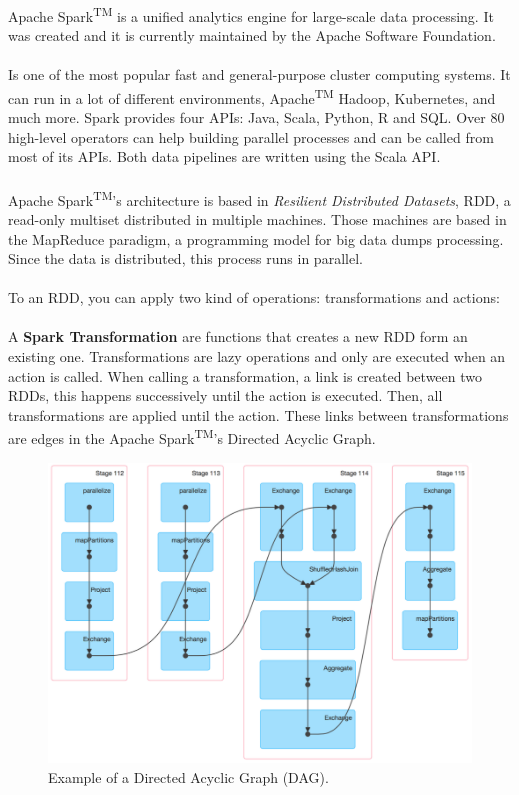 Apache Spark\textsuperscript{TM} is a unified analytics engine for large-scale data processing. It was created and it is currently maintained by the Apache Software Foundation\cite{apache_software_foundation}.
\\\\
Is one of the most popular fast and general-purpose cluster computing systems. It can run in a lot of different environments, Apache\textsuperscript{TM} Hadoop\textregistered\cite{hadoop}, Kubernetes\cite{k8s},  and much more. Spark provides four APIs: Java, Scala, Python, R and SQL. Over 80 high-level operators can help building parallel processes and can be called from most of its APIs. Both data pipelines are written using the Scala API.
\\\\
Apache Spark\textsuperscript{TM}'s architecture is based in \textit{Resilient Distributed Datasets}, RDD, a read-only multiset distributed in multiple machines. Those machines are based in the MapReduce paradigm, a programming model for big data dumps processing. Since the data is distributed, this process runs in parallel.
\\\\
To an RDD, you can apply two kind of operations: transformations and actions:
\\\\
A \textbf{Spark Transformation} are functions that creates a new RDD form an existing one. Transformations are lazy operations and only are executed when an action is called. When calling a transformation, a link is created between two RDDs, this happens successively until the action is executed. Then, all transformations are applied until the action. These links between transformations are edges in the Apache Spark\textsuperscript{TM}'s Directed Acyclic Graph.

\begin{figure}[H]
\centering
\includegraphics[scale=0.3]{resources/dag.png}
\caption{Example of a Directed Acyclic Graph (DAG).}
\end{figure}

